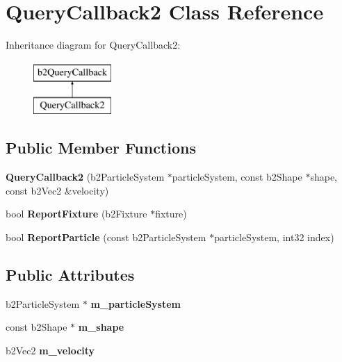 \hypertarget{classQueryCallback2}{\section{Query\-Callback2 Class Reference}
\label{classQueryCallback2}
}
Inheritance diagram for Query\-Callback2\-:\begin{figure}[H]
\begin{center}
\leavevmode
\includegraphics[height=2.000000cm]{classQueryCallback2}
\end{center}
\end{figure}
\subsection*{Public Member Functions}
\begin{DoxyCompactItemize}
\item 
\hypertarget{classQueryCallback2_a02424794d93face18cb282124788ce50}{{\bfseries Query\-Callback2} (b2\-Particle\-System $\ast$particle\-System, const b2\-Shape $\ast$shape, const b2\-Vec2 \&velocity)}\label{classQueryCallback2_a02424794d93face18cb282124788ce50}

\item 
\hypertarget{classQueryCallback2_addabdd594fa18ef09a03ec292417e2f6}{bool {\bfseries Report\-Fixture} (b2\-Fixture $\ast$fixture)}\label{classQueryCallback2_addabdd594fa18ef09a03ec292417e2f6}

\item 
\hypertarget{classQueryCallback2_a328cfeed630549c310dd94ed2bd85908}{bool {\bfseries Report\-Particle} (const b2\-Particle\-System $\ast$particle\-System, int32 index)}\label{classQueryCallback2_a328cfeed630549c310dd94ed2bd85908}

\end{DoxyCompactItemize}
\subsection*{Public Attributes}
\begin{DoxyCompactItemize}
\item 
\hypertarget{classQueryCallback2_adaf7d6830942d6eb9f833a941fabdddb}{b2\-Particle\-System $\ast$ {\bfseries m\-\_\-particle\-System}}\label{classQueryCallback2_adaf7d6830942d6eb9f833a941fabdddb}

\item 
\hypertarget{classQueryCallback2_a6f9b622a9bf8875190c8da9fcac340fd}{const b2\-Shape $\ast$ {\bfseries m\-\_\-shape}}\label{classQueryCallback2_a6f9b622a9bf8875190c8da9fcac340fd}

\item 
\hypertarget{classQueryCallback2_a5d345f512492fcdec190ec87afd69e0c}{b2\-Vec2 {\bfseries m\-\_\-velocity}}\label{classQueryCallback2_a5d345f512492fcdec190ec87afd69e0c}

\end{DoxyCompactItemize}


